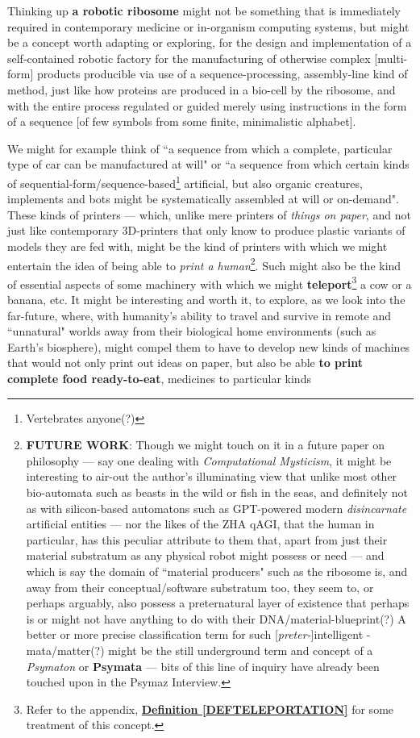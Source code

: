 \documentclass[a4paper, 18pt]{book} %
\begin{document}
Thinking up \textbf{a robotic ribosome} might not be something that is immediately required in contemporary medicine or in-organism computing systems, but might be a concept worth adapting or exploring, for the design and implementation of a self-contained robotic factory for the manufacturing of otherwise complex [multi-form] products producible via use of a sequence-processing, assembly-line kind of method, just like how proteins are produced in a bio-cell by the ribosome, and with the entire process regulated or guided merely using instructions in the form of a sequence [of few symbols from some finite, minimalistic alphabet].

We might for example think of ``a sequence from which a complete, particular type of car can be manufactured at will" or ``a sequence from which certain kinds of sequential-form/sequence-based\footnote{Vertebrates anyone(?)} artificial, but also organic creatures, implements and bots might be systematically assembled at will or on-demand". These kinds of printers --- which, unlike mere printers of \textit{things on paper}, and not just like contemporary 3D-printers that only know to produce plastic variants of models they are fed with, might be the kind of printers with which we might entertain the idea of being able to \textit{print a human}\footnote{\textbf{FUTURE WORK}: Though we might touch on it in a future paper on philosophy --- say one dealing with \textit{Computational Mysticism}\cite{lutalo2024mysticism}, it might be interesting to air-out the author's illuminating view that unlike most other bio-automata such as beasts in the wild or fish in the seas, and definitely not as with silicon-based automatons such as GPT-powered modern \textit{disincarnate} artificial entities --- nor the likes of the ZHA qAGI\cite{jwlzha}, that the human in particular, has this peculiar attribute to them that, apart from just their material substratum as any physical robot might possess or need --- and which is say the domain of ``material producers" such as the ribosome is, and away from their conceptual/software substratum too, they seem to, or perhaps arguably, also possess a preternatural layer of existence that perhaps is or might not have anything to do with their DNA/material-blueprint(?) A better or more precise classification term for such [\textit{preter-}]intelligent -mata/matter(?) might be the still underground term and concept of a \textit{Psymaton} or \textbf{Psymata} --- bits of this line of inquiry have already been touched upon in the Psymaz Interview\cite{lutalo2025unraveling}.}. Such might also be the kind of essential aspects of some machinery with which we might \textbf{teleport}\footnote{Refer to the appendix, \textbf{\hyperref[DEFTELEPORTATION]{Definition \ref{DEFTELEPORTATION}}} for some treatment of this concept.} a cow or a banana, etc. It might be interesting and worth it, to explore, as we look into the far-future, where, with humanity's ability to travel and survive in remote and ``unnatural" worlds away from their biological home environments (such as Earth's biosphere), might compel them to have to develop new kinds of machines that would not only print out ideas on paper, but also be able \textbf{to print complete food ready-to-eat}, medicines to particular kinds 
\end{document}
